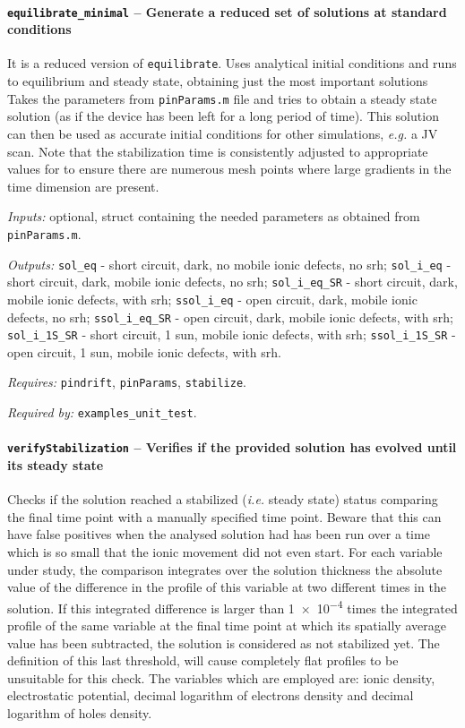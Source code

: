 \paragraph{\texttt{equilibrate\_minimal} -- Generate a reduced set of solutions at standard conditions}
It is a reduced version of \texttt{equilibrate}. 
Uses analytical initial conditions and runs to equilibrium and steady state, obtaining just the most important solutions
 Takes the parameters from \texttt{pin\-Params.m} file and tries
 to obtain a steady state solution (as if the device has been left for
 a long period of time). This solution can then be used as accurate
 initial conditions for other simulations, \textsl{e.g.} a JV scan.
 Note that the stabilization time is consistently adjusted to appropriate values for to
 ensure there are numerous mesh points where large gradients in the time
 dimension are present.
 
\textit{Inputs:} optional, struct containing the needed parameters as obtained
     from \texttt{pin\-Params.m}.
     
\textit{Outputs:} \texttt{sol\_eq} - short circuit, dark, no mobile ionic defects, no \gls{srh};
   \texttt{sol\_i\_eq} - short circuit, dark, mobile ionic defects, no \gls{srh};
   \texttt{sol\_i\_eq\_SR} - short circuit, dark, mobile ionic defects, with \gls{srh};
   \texttt{ssol\_i\_eq} - open circuit, dark, mobile ionic defects, no \gls{srh};
   \texttt{ssol\_i\_eq\_SR} - open circuit, dark, mobile ionic defects, with \gls{srh};
   \texttt{sol\_i\_1S\_SR} - short circuit, 1 sun, mobile ionic defects, with \gls{srh};
   \texttt{ssol\_i\_1S\_SR} - open circuit, 1 sun, mobile ionic defects, with \gls{srh}.

\textit{Requires:} \texttt{pin\-drift}, \texttt{pinParams}, \texttt{stabilize}.

\textit{Required by:} \texttt{examples\_unit\_test}.

		\paragraph{\texttt{verify\-Stabilization} -- Verifies if the provided solution has evolved until its steady state}\label{verifyStabilization}
Checks if the solution reached a stabilized (\textsl{i.e.} steady state) status comparing the final time point with a manually specified time point. Beware that this can have false positives when the analysed solution had
 has been run over a time which is so small that the ionic movement did not even start.
 For each variable under study, the comparison integrates over the solution thickness the absolute value of the difference in the profile of this variable at two different times in the solution.
 If this integrated difference is larger than \num{1e-4} times the integrated profile of the same variable at the final time point at which its spatially average value has been subtracted, the solution is considered as not stabilized yet.
 The definition of this last threshold, will cause completely flat profiles to be unsuitable for this check.
 The variables which are employed are: ionic density, electrostatic potential, decimal logarithm of electrons density and decimal logarithm of holes density.
 
